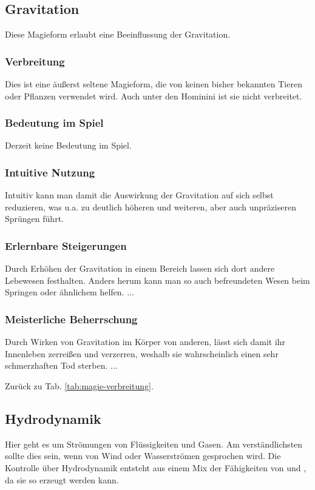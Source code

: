 \subsection{Gravitation}\label{sec:gravitationsmagie}
Diese Magieform erlaubt eine Beeinflussung der Gravitation.

\subsubsection{Verbreitung}
Dies ist eine äußerst seltene Magieform, die von keinen bisher bekannten Tieren oder Pflanzen verwendet wird.
Auch unter den Hominini ist sie nicht verbreitet.

\subsubsection{Bedeutung im Spiel}
Derzeit keine Bedeutung im Spiel.

\subsubsection{Intuitive Nutzung}
Intuitiv kann man damit die Auswirkung der Gravitation auf sich selbst reduzieren, was u.a. zu deutlich höheren und weiteren, aber auch unpräziseren Sprüngen führt.

\subsubsection{Erlernbare Steigerungen}
\begin{outline}
	\1 Durch Erhöhen der Gravitation in einem Bereich lassen sich dort andere Lebewesen festhalten.
	\1 Anders herum kann man so auch befreundeten Wesen beim Springen oder ähnlichem helfen.
	\1 ...
\end{outline}

\subsubsection{Meisterliche Beherrschung} 
\begin{outline}
	\1 Durch Wirken von Gravitation im Körper von anderen, lässt sich damit ihr Innenleben zerreißen und verzerren, weshalb sie wahrscheinlich einen sehr schmerzhaften Tod sterben.
	\1 ...
\end{outline}
Zurück zu Tab. \ref{tab:magie-verbreitung}.



\subsection{Hydrodynamik}\label{sec:hydrodynamikmagie}
Hier geht es  um Strömungen von Flüssigkeiten und Gasen.
Am verständlichsten sollte dies sein, wenn von Wind oder Wasserströmen gesprochen wird.
Die Kontrolle über Hydrodynamik entsteht aus einem Mix der Fähigkeiten von  und , da sie so erzeugt werden kann.


